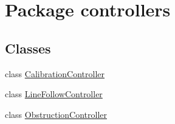 \hypertarget{namespacecontrollers}{\section{Package controllers}
\label{namespacecontrollers}
}
\subsection*{Classes}
\begin{DoxyCompactItemize}
\item 
class \hyperlink{classcontrollers_1_1_calibration_controller}{Calibration\-Controller}
\item 
class \hyperlink{classcontrollers_1_1_line_follow_controller}{Line\-Follow\-Controller}
\item 
class \hyperlink{classcontrollers_1_1_obstruction_controller}{Obstruction\-Controller}
\end{DoxyCompactItemize}
